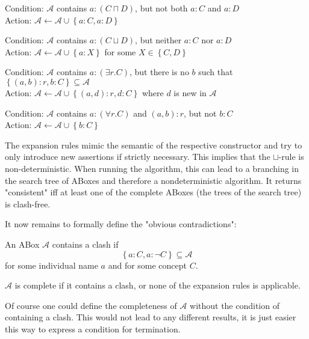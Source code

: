 \begin{mdframed}[frametitle = expansion rules]
	\begin{mdframed}[frametitle= The $\sqcap$-rule]
		Condition: $\mathcal{A}$ contains $a: (C \sqcap D)$, but not both $a:C$ and $a:D$ \\
		Action: $\mathcal{A} \leftarrow \mathcal{A} \cup \left\{ a:C, a:D \right\} $
	\end{mdframed}
	\begin{mdframed}[frametitle= The $\sqcup$-rule]
		Condition: $\mathcal{A}$ contains $a: (C \sqcup D)$, but neither $a:C$ nor $a:D$\\
		Action: $\mathcal{A} \leftarrow \mathcal{A} \cup \left\{ a:X \right\} $ for some $X \in \left\{ C,D \right\}$
	\end{mdframed}
	\begin{mdframed}[frametitle= The $\exists$-rule]
		Condition: $\mathcal{A}$ contains $a:(\exists r.C)$, but there is no $b$ such that \\$\left\{ (a,b) :r, b:C \right\} \subseteq \mathcal{A}$ \\
		Action: $\mathcal{A} \leftarrow \mathcal{A} \cup \left\{ (a,d):r, d:C \right\} $ where $d$ is new in $\mathcal{A}$
	\end{mdframed}
	\begin{mdframed}[frametitle= The $\forall$-rule]
		Condition: $\mathcal{A}$ contains $a:(\forall r.C)$ and $(a,b):r$, but not $b:C$\\
		Action: $\mathcal{A} \leftarrow \mathcal{A} \cup \left\{ b:C\right\} $
	\end{mdframed}
\end{mdframed}
\begin{note}
	The expansion rules mimic the semantic of the respective constructor
	and try to only introduce new assertions if strictly necessary.
	This implies that the $\sqcup$-rule is non-deterministic.
	When running the algorithm, this can lead to a branching in the search tree of ABoxes
	and therefore a nondeterministic algorithm.
	It returns "consistent" iff at least one of the complete ABoxes (the trees of the search tree) is clash-free.
\end{note}

It now remains to formally define the "obvious contradictions":
\begin{definition}
	An ABox $\mathcal{A}$ contains a clash if
	\[
	\left\{ a:C, a: \neg C \right\} \subseteq \mathcal{A}
	\]
	for some individual name $a$ and for some concept $C$.

	$\mathcal{A}$ is complete if it contains a clash, or none of the expansion rules is applicable.
\end{definition}
\begin{note}
	Of course one could define the completeness of $\mathcal{A}$ without the condition of containing a clash.
	This would not lead to any different results, it is just easier this way to express a condition for termination.
\end{note}

